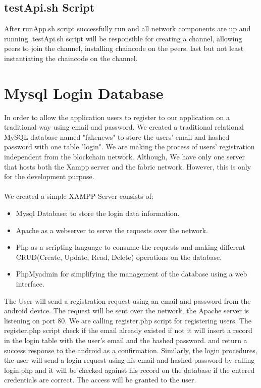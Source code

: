 \subsection{testApi.sh Script }

After runApp.sh script successfully run and all network components are up and running. testApi.sh script will be responsible for creating a channel, allowing peers to join the channel, installing chaincode on the peers. last but not least instantiating the chaincode on the channel.
\cleardoublepage

\section{Mysql Login Database} 
In order to allow the application users to register to our application on a traditional way using email and password. We created a traditional relational MySQL database named "fakenews" to store the users' email and hashed password with one table "login". 
We are making the process of users' registration independent from the blockchain network.
Although, We have only one server that hosts both the Xampp server and the fabric network. However, this is only for the development purpose. \\
\ \\ 
We created a simple XAMPP Server consists of: 
\begin{itemize}
   \item Mysql Database: to store the login data information. 
   \item Apache as a webserver to serve the requests over the network. 
   \item Php as a scripting language to consume the requests and making different CRUD(Create, Update, Read, Delete) operations on the database.
   \item PhpMyadmin for simplifying the management of the database using a web interface. 
\end{itemize}  
\bigskip
The User will send a registration request using an email and password from the android device.  The request will be sent over the network, the Apache server is listening on port 80. We are calling register.php script for registering users. The register.php script check if the email already existed if not it will insert a record in the login table with the user's email and the hashed password. and return a success response to the android as a confirmation. 
Similarly,  the login procedures, the user will send a login request using his email and hashed password by calling login.php and it will be checked against his record on the database if the entered credentials are correct. The access will be granted to the user. \\ 
